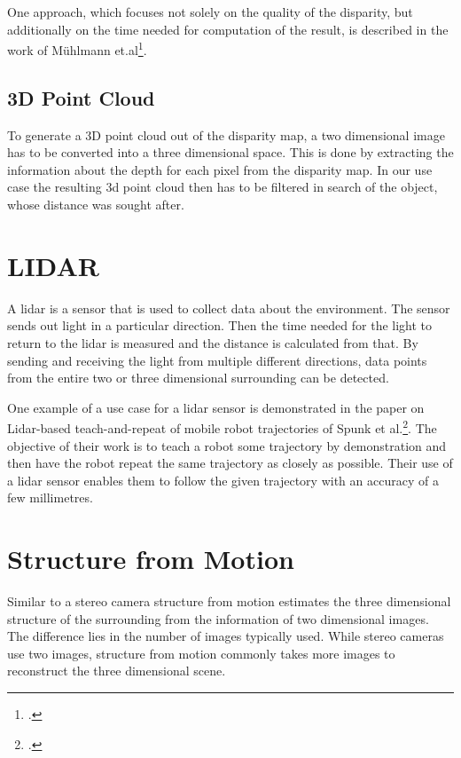 One approach, which focuses not solely on the quality of the disparity, but additionally on the time needed for computation of the result, is described in the work of Mühlmann et.al\footcite{Muehlmann_Calculating_Dense_Disparity_Maps_from_Color_Stereo_Images}.

\subsection{3D Point Cloud}
To generate a 3D point cloud out of the disparity map, a two dimensional image has to be converted into a three dimensional space. This is done by extracting the information about the depth for each pixel from the disparity map. In our use case the resulting 3d point cloud then has to be filtered in search of the object, whose distance was sought after.

\section{LIDAR}
A lidar is a sensor that is used to collect data about the environment. The sensor sends out light in a particular direction. Then the time needed for the light to return to the lidar is measured and the distance is calculated from that. By sending and receiving the light from multiple different directions, data points from the entire two or three dimensional surrounding can be detected.

One example of a use case for a lidar sensor is demonstrated in the paper on Lidar-based teach-and-repeat of mobile robot trajectories of Spunk et al.\footcite{Sprunk_Lidar-based_teach-and-repeat_of_mobile_robot_trajectories}. The objective of their work is to teach a robot some trajectory by demonstration and then have the robot repeat the same trajectory as closely as possible. Their use of a lidar sensor enables them to follow the given trajectory with an accuracy of a few millimetres.

\section{Structure from Motion}
Similar to a stereo camera structure from motion estimates the three dimensional structure of the surrounding from the information of two dimensional images. The difference lies in the number of images typically used. While stereo cameras use two images, structure from motion commonly takes more images to reconstruct the three dimensional scene.

